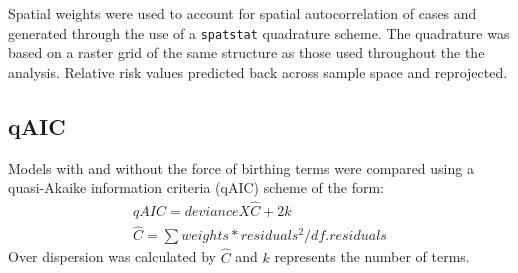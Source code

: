 \documentclass[9pt,twoside,lineno]{pnas-new}
\begin{document}
	Spatial weights were used to account for spatial autocorrelation of cases and generated through the use of a \texttt{spatstat} quadrature scheme.
The quadrature was based on a raster grid of the same structure as those used throughout the the analysis. Relative risk values predicted back across sample space and reprojected.

\subsection{qAIC}
\label{qAIC}
Models with and without the force of birthing terms were compared using a quasi-Akaike information criteria (qAIC) scheme of the form: 
\begin{equation}
    \begin{gathered}
        qAIC = deviance X \hat{C} + 2k \\
        \hat{C} = \sum{weights * residuals^2}/df.residuals
    \end{gathered}
\end{equation}
Over dispersion was calculated by $\hat{C}$ and $k$ represents the number of terms.\\


\end{document}

